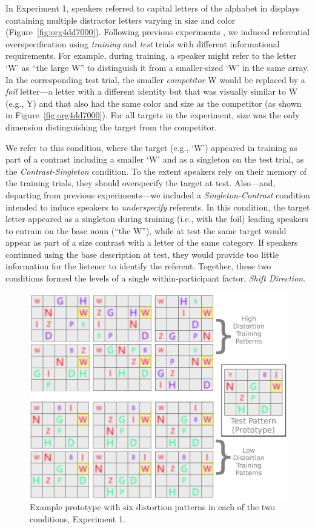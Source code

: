 \documentclass[natbib,man,a4paper]{apa6}
\begin{document}
In Experiment 1, speakers referred to capital letters of the alphabet in displays containing multiple distractor letters varying in size and color (Figure~\ref{fig:org4dd7000}). Following previous experiments \citep{brennanclark96,GannBarr2014}, we induced referential overspecification using \emph{training} and \emph{test} trials with different informational requirements. For example, during training, a speaker might refer to the letter `W' as ``the large W'' to distinguish it from a smaller-sized `W' in the same array. In the corresponding test trial, the smaller \emph{competitor} W would be replaced by a \emph{foil} letter---a letter with a different identity but that was visually similar to W (e.g., Y) and that also had the same color and size as the competitor (as shown in Figure~\ref{fig:org4dd7000}). For all targets in the experiment, size was the only dimension distinguishing the target from the competitor.

We refer to this condition, where the target (e.g., `W') appeared in training as part of a contrast including a smaller `W' and as a singleton on the test trial, as the  \emph{Contrast-Singleton} condition. To the extent speakers rely on their memory of the training trials, they should overspecify the target at test. Also---and, departing from previous experiments---we included a \emph{Singleton-Contrast} condition intended to induce speakers to \emph{underspecify} referents. In this condition, the target letter appeared as a singleton during training (i.e., with the foil) leading speakers to entrain on the base noun (``the W''), while at test the same target would appear as part of a size contrast with a letter of the same category. If speakers continued using the base description at test, they would provide too little information for the listener to identify the referent.  Together, these two conditions formed the levels of a single within-participant factor, \emph{Shift Direction}.

\begin{figure}[htbp]
\centering
\includegraphics[width=.9\linewidth]{figs/Exp1_HvL.png}
\caption{\label{fig:orgcaa0713}
Example prototype with six distortion patterns in each of the two conditions, Experiment 1.}
\end{figure}
\end{document}

